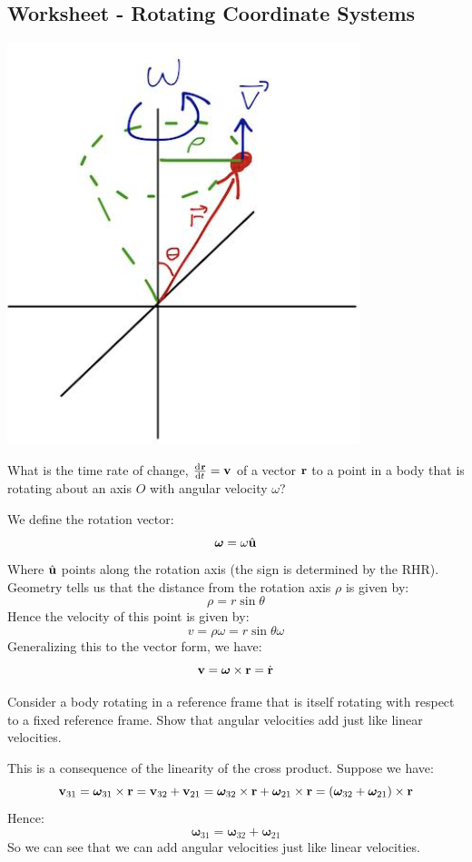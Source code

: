 \documentclass[../PHYS306Notes.tex]{subfiles}
\begin{document}
\subsection{Worksheet - Rotating Coordinate Systems}
\begin{center}
    \includegraphics[scale=0.75]{Lecture-15/w15-img1.png}
\end{center}
\begin{p}
What is the time rate of change, $\od{\v{r}}{t} = \v{v}$ of a vector $\mathbf{r}$ to a point in a body that is rotating about an axis $O$ with angular velocity $\omega$?
\end{p}
\begin{s}
We define the rotation vector:
\[\bm{\omega} = \omega\hat{\mathbf{u}}\]
Where $\hat{\mathbf{u}}$ points along the rotation axis (the sign is determined by the RHR). Geometry tells us that the distance from the rotation axis $\rho$ is given by:
\[\rho = r\sin\theta\]
Hence the velocity of this point is given by:
\[v = \rho\omega = r\sin\theta\omega\]
Generalizing this to the vector form, we have:
\[\mathbf{v} = \bm{\omega} \times \mathbf{r} = \dot{\mathbf{r}}\]
\end{s}

\begin{p}
Consider a body rotating in a reference frame that is itself rotating with respect to a fixed reference frame. Show that angular velocities add just like linear velocities.
\end{p}
\begin{s}
This is a consequence of the linearity of the cross product. Suppose we have:
\[\mathbf{v}_{31} = \bm{\omega}_{31}\times \mathbf{r} = \mathbf{v}_{32} + \mathbf{v}_{21} = \bm{\omega}_{32}\times \mathbf{r} + \bm{\omega}_{21}\times \mathbf{r} = (\bm{\omega}_{32} + \bm{\omega}_{21})\times \mathbf{r}\]
Hence:
\[\bm{\omega}_{31} = \bm{\omega}_{32} + \bm{\omega}_{21}\]
So we can see that we can add angular velocities just like linear velocities.
\end{s}
\end{document}
